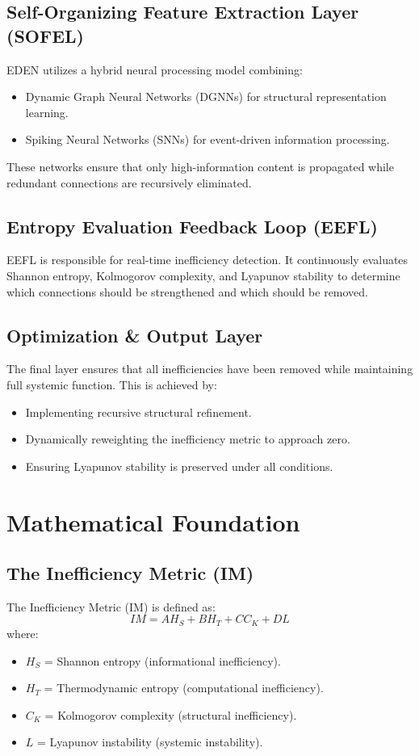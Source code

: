 \documentclass{article}
\begin{document}
\subsection{Self-Organizing Feature Extraction Layer (SOFEL)}
EDEN utilizes a hybrid neural processing model combining:
\begin{itemize}
    \item Dynamic Graph Neural Networks (DGNNs) for structural representation learning.
    \item Spiking Neural Networks (SNNs) for event-driven information processing.
\end{itemize}
These networks ensure that only high-information content is propagated while redundant connections are recursively eliminated.

\subsection{Entropy Evaluation Feedback Loop (EEFL)}
EEFL is responsible for real-time inefficiency detection. It continuously evaluates Shannon entropy, Kolmogorov complexity, and Lyapunov stability to determine which connections should be strengthened and which should be removed.

\subsection{Optimization \& Output Layer}
The final layer ensures that all inefficiencies have been removed while maintaining full systemic function. This is achieved by:
\begin{itemize}
    \item Implementing recursive structural refinement.
    \item Dynamically reweighting the inefficiency metric to approach zero.
    \item Ensuring Lyapunov stability is preserved under all conditions.
\end{itemize}

\section{Mathematical Foundation}

\subsection{The Inefficiency Metric (IM)}
The Inefficiency Metric (IM) is defined as:
\begin{equation}
IM = A H_S + B H_T + C C_K + D L
\end{equation}
where:
\begin{itemize}
    \item $H_S$ = Shannon entropy (informational inefficiency).
    \item $H_T$ = Thermodynamic entropy (computational inefficiency).
    \item $C_K$ = Kolmogorov complexity (structural inefficiency).
    \item $L$ = Lyapunov instability (systemic instability).
\end{itemize}
\end{document}
